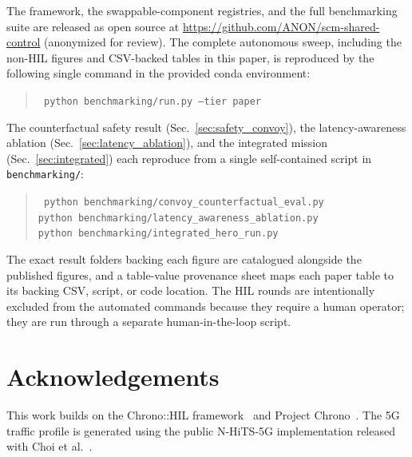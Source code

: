 \documentclass[conference,letterpaper,10pt]{IEEEtran}
\begin{document}
The framework, the swappable-component registries, and the full
benchmarking suite are released as open source at
\url{https://github.com/ANON/scm-shared-control} (anonymized for review).
The complete autonomous sweep, including the non-HIL figures and
CSV-backed tables in this paper, is reproduced by the following single
command in the provided conda environment:
\begin{quote}\small\tt
python benchmarking/run.py --tier paper
\end{quote}
The counterfactual safety result (Sec.~\ref{sec:safety_convoy}), the
latency-awareness ablation (Sec.~\ref{sec:latency_ablation}), and the
integrated mission (Sec.~\ref{sec:integrated}) each reproduce from a single
self-contained script in \texttt{benchmarking/}:
\begin{quote}\scriptsize\tt
python benchmarking/convoy\_counterfactual\_eval.py\\
python benchmarking/latency\_awareness\_ablation.py\\
python benchmarking/integrated\_hero\_run.py
\end{quote}
The exact result folders backing each figure are catalogued alongside
the published figures, and a table-value provenance sheet maps each
paper table to its backing CSV, script, or code location. The HIL
rounds are intentionally excluded from the automated commands because
they require a human operator; they are run through a separate
human-in-the-loop script.

\section*{Acknowledgements}

This work builds on the Chrono::HIL framework~\cite{Zhou23} and
Project Chrono~\cite{Tasora16,Serban19}. The 5G traffic profile is
generated using the public N-HiTS-5G implementation released with
Choi et al.~\cite{Choi23}.
\end{document}
